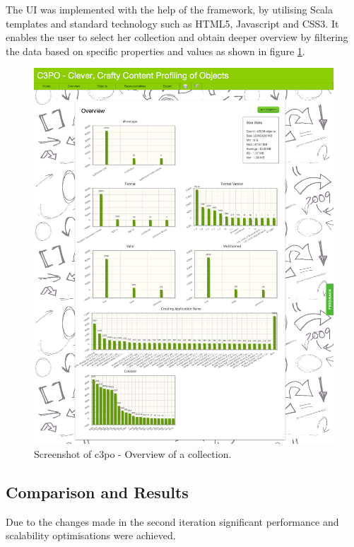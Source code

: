 The UI was implemented with the help of the framework, by utilising Scala templates and standard technology such as HTML5, Javascript and CSS3. It enables the user to select her collection and obtain deeper overview by filtering the data based on specific properties and values as shown in figure \ref{fig:web_app_overview}.

\begin{figure}[tbp]
\begin{center}
\includegraphics[width=5.5in]{figures/architecture/web_app_overview}
\caption{Screenshot of c3po - Overview of a collection.}
\label{fig:web_app_overview}
\end{center}
\end{figure}

\subsection{Comparison and Results}
Due to the changes made in the second iteration significant performance and scalability optimisations were achieved.

